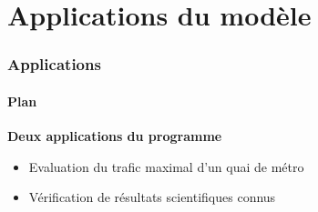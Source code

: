 
\section{Applications du modèle}


\begin{frame}

    \frametitle{Applications}
    \framesubtitle{Plan}

    \textbf{Deux applications du programme}\\
    \begin{itemize}
        \item <2-> Evaluation du trafic maximal d'un quai de métro
        \item <3-> Vérification de résultats scientifiques connus

    \end{itemize}
\end{frame}



